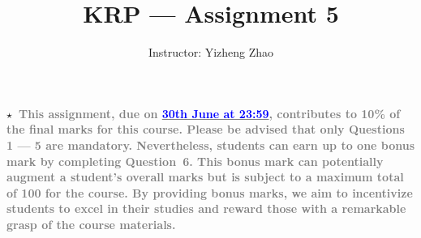 \documentclass[12pt,a4paper]{article}
\begin{document}
\title{{\color{blue}KRP --- Assignment 5}}
\author{Instructor: Yizheng Zhao}

 
\maketitle

\textbf{$\star$~\textcolor{gray}{This assignment, due on \underline{\textcolor{blue}{30th June at 23:59}}, contributes to 10\% of the final marks for this course. Please be advised that only Questions 1 --- 5 are mandatory. Nevertheless, students can earn up to one bonus mark by completing Question~6. This bonus mark can potentially augment a student's overall marks but is subject to a maximum total of 100 for the course. By providing bonus marks, we aim to incentivize students to excel in their studies and reward those with a remarkable grasp of the course materials.}}
\end{document}
